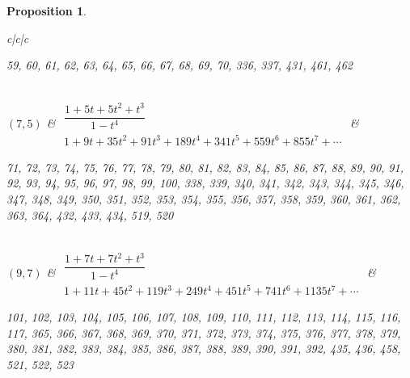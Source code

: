 \documentclass[10pt,a4paper]{amsart}
\newtheorem{prop}[thm]{Proposition}
\theoremstyle{definition}
\numberwithin{equation}{section}
\begin{document}
\begin{prop}
\begin{table}[h!]
\begin{tabu}{c|c|c}
\begin{minipage}{4cm}
 \rm
 	59, 60, 61, 62, 63, 64, 65, 66, 67, 68,
	 69, 70, 336, 337, 431, 461, 462
 \end{minipage}
	\\ \hline
	$(7,5)$\label{T(5,7)}
	&
	$\begin{array}{c}
	 \dfrac{1+5t+5t^2+t^3}{1-t^4} \\[15pt]
	 {1+9t+35t^2+91t^3+189t^4+341t^5+559t^6+855t^7+\cdots}
	\end{array}$
	&
	 \begin{minipage}{4cm}
 \rm
 	71, 72, 73, 74, 75, 76, 77, 78, 79, 80,
	 81, 82, 83, 84, 85, 86, 87, 88, 89, 90,
	 91, 92, 93, 94, 95, 96, 97, 98, 99, 100,
	 338, 339, 340, 341, 342, 343, 344, 345, 346, 347,
	 348, 349, 350, 351, 352, 353, 354, 355, 356, 357,
	 358, 359, 360, 361, 362, 363, 364, 432, 433, 434,
	 519, 520
 \end{minipage}
\\ \hline
	$(9,7)$\label{T(7,9)}
	&
	$\begin{array}{c}
	 \dfrac{1+7t+7t^2+t^3}{1-t^4} \\[15pt]
	 {1+11t+45t^2+119t^3+249t^4+451t^5+741t^6+1135t^7+\cdots}
	\end{array}$
	&
	 \begin{minipage}{4cm}
 \rm
 	101, 102, 103, 104, 105, 106, 107, 108, 109, 110,
	 111, 112, 113, 114, 115, 116, 117, 365, 366, 367,
	 368, 369, 370, 371, 372, 373, 374, 375, 376, 377,
	 378, 379, 380, 381, 382, 383, 384, 385, 386, 387,
	 388, 389, 390, 391, 392, 435, 436, 458, 521, 522,
	 523
 \end{minipage}
 \\
\hline
\end{tabu}%
\end{table}


\end{prop}
\end{document}
